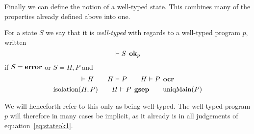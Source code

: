 Finally we can define the notion of a well-typed state. This combines many of
the properties already defined above into one.
\begin{definition}
  For a state $S$ we say that it is \emph{well-typed} with regards to a well-typed
  program $p$, written
  \begin{equation*}
    \vdash S \:\: \mbox{{\bf ok}$_p$}
  \end{equation*}
  if $S = \mbox{{\bf error}}$ or $S = H, P$ and
  \begin{equation} \label{eq:stateok1}
    \begin{gathered}
      \vdash H \quad\quad H \vdash P \quad\quad H \vdash P \:\: \mbox{\bf ocr} \\
      \mbox{$\mathrm{isolation}$}{(H, P)} \quad\quad H \vdash P \:\: \mbox{\bf gsep} \quad\quad \mbox{$\mathrm{uniqMain}$}(P)
    \end{gathered}
  \end{equation}
\end{definition}

\begin{remark}
  We will henceforth refer to this only as being well-typed. The well-typed
  program $p$ will therefore in many cases be implicit, as it already is in all
  judgements of equation~\eqref{eq:stateok1}.
\end{remark}

%
%





